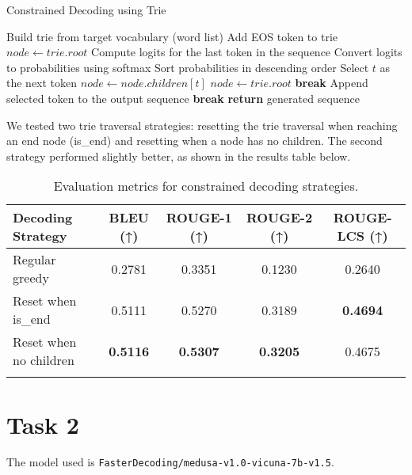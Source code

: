 \documentclass[11pt]{article}
\begin{document}
\begin{algorithm}
\caption{Constrained Decoding using Trie}
\begin{algorithmic}[1]
\State Build trie from target vocabulary (word list)
\State Add EOS token to trie
\State $node \gets trie.root$
    \State Compute logits for the last token in the sequence
    \State Convert logits to probabilities using softmax
    \State Sort probabilities in descending order
            \State Select $t$ as the next token
            \State $node \gets node.children[t]$
             
                        \State $node \gets trie.root$ 
                    \EndIf
            \State \textbf{break}
        \EndIf
    \EndFor
    \State Append selected token to the output sequence
        \State \textbf{break}
    \EndIf
\EndFor
\State \textbf{return} generated sequence
\end{algorithmic}
\end{algorithm}

We tested two trie traversal strategies: resetting the trie traversal when reaching an end node (is\_end) and resetting when a node has no children. The second strategy performed slightly better, as shown in the results table below.

\begin{longtable}{|l|c|c|c|c|}
    \hline
    \textbf{Decoding Strategy} & \textbf{BLEU} (↑) & \textbf{ROUGE-1} (↑) & \textbf{ROUGE-2} (↑) & \textbf{ROUGE-LCS} (↑) \\
    \hline
    Regular greedy & 0.2781 & 0.3351 & 0.1230 & 0.2640 \\
    \hline
    Reset when is\_end & 0.5111 & 0.5270 & 0.3189 & \textbf{0.4694} \\
    \hline
    Reset when no children & \textbf{0.5116} & \textbf{0.5307} & \textbf{0.3205} & 0.4675 \\
    \hline
    \caption{Evaluation metrics for constrained decoding strategies.}
\end{longtable}

\section{Task 2}
The model used is \texttt{FasterDecoding/medusa-v1.0-vicuna-7b-v1.5}.
\end{document}
